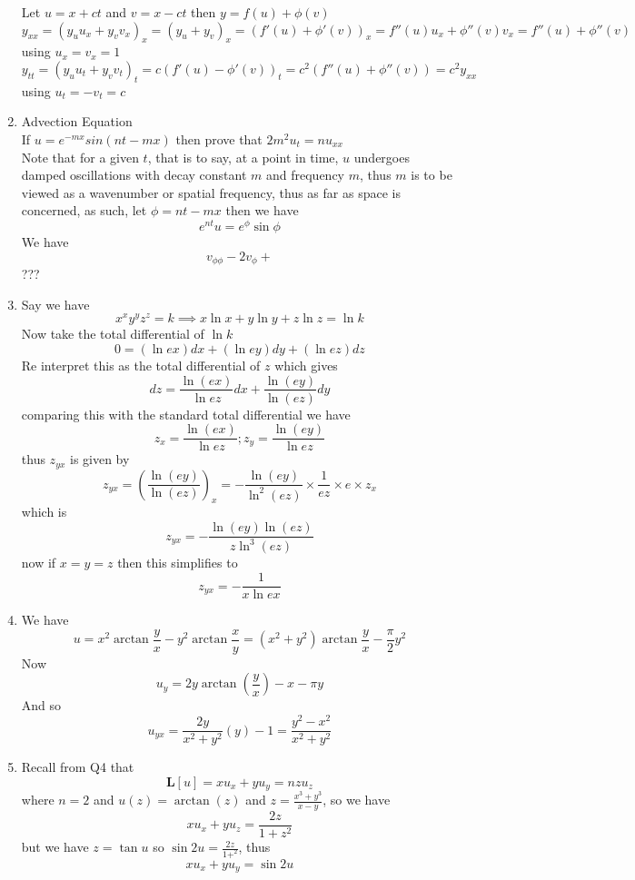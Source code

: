 \documentclass[12pt]{article}
\begin{document}
\begin{enumerate}
Let $u = x + ct$ and $v=x-ct$ then $y = f(u) + \phi(v)$
$$
y_{x x} = (y_{u}u_{x} + y_{v}v_{x})_{x}= (y_{u} + y_{v})_{x} = (f'(u)+\phi'(v))_{x} = f''(u)u_{x} + \phi''(v)v_{x} = f''(u) + \phi''(v)
$$
using $u_{x}=v_{x}=1$
$$
\boxed{
y_{tt} = (y_{u}u_{t} + y_{v}v_{t})_{t} = c(f'(u) - \phi'(v))_{t} = c^{2}(f''(u)+\phi''(v)) = c^{2}y_{xx}
}
$$
using $u_{t} = -v_{t} = c$
\item Advection Equation \\
If $u = e^{ -mx }sin(nt-mx)$ then prove that $2m^{2}u_{t} = n u_{xx}$ \\
Note that for a given $t$, that is to say, at a point in time, $u$ undergoes damped oscillations with decay constant $m$ and frequency $m$, thus $m$ is to be viewed as a wavenumber or spatial frequency, thus as far as space is concerned, as such, let $\phi = nt-mx$ then we have
$$
e^{ nt }u = e^{ \phi }\sin \phi
$$
We have
$$
v_{\phi \phi} -2v_{\phi} + 
$$
???
\item
Say we have
$$
x^{x}  y^{y} z^{z} = k \implies x\ln x + y\ln y + z \ln z = \ln k
$$
Now take the total differential of $\ln k$
$$
0 = (\ln ex)dx + (\ln ey)dy + (\ln ez)dz
$$
Re interpret this as the total differential of $z$ which gives
$$
dz = \frac{\ln(ex)}{\ln ez}dx + \frac{\ln (ey)}{\ln(ez)}dy
$$
comparing this with the standard total differential we have
$$
z_{x} = \frac{\ln(ex)}{\ln ez}; z_{y}= \frac{\ln(ey)}{\ln ez}
$$
thus $z_{yx}$ is given by
$$
z_{yx} = \left( \frac{\ln(ey)}{\ln(ez)} \right)_{x} = -\frac{\ln(ey)}{\ln ^{2}(ez)} \times\frac{1}{ez}\times e\times z_{x}
$$
which is
$$
z_{yx} = -\frac{\ln(ey)\ln (ez) }{z\ln ^{3}(ez)}
$$
now if $x=y=z$ then this simplifies to
$$
\boxed{
z_{yx} = -\frac{1}{x\ln ex}
}
$$
\item
We have
$$
u = x^{2} \arctan \frac{y}{x} -y^{2} \arctan \frac{x}{y} = (x^{2} + y^{2})\arctan \frac{y}{x} -\frac{\pi}{2}y^{2}
$$
Now 
$$
u_{y} = 2y\arctan\left( \frac{y}{x} \right) -x - \pi y
$$
And so
$$
\boxed{
u_{yx} = \frac{2y}{x^{2} +y^{2}}(y) - 1 = \frac{y^{2}-x^{2}}{x^{2} + y^{2}}
}
$$

\item
Recall from Q4 that
$$
\mathbf{L}[u] = xu_{x} + yu_{y} = nzu_{z}
$$
where $n=2$ and $u(z) = \arctan(z)$ and $z=\frac{x^{3} + y^{3}}{x-y}$, so we have
$$
xu_{x} + yu_{z} = \frac{2z}{1 + z^{2}} 
$$
but we have $z= \tan u$ so $\sin 2u = \frac{2z}{1 + ^{2}}$, thus
$$
xu_{x} + yu_{y} = \sin 2u
$$


\end{enumerate}
\end{document}
